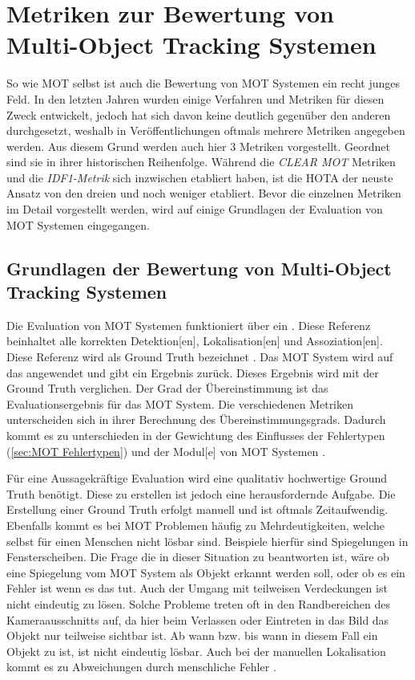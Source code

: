 \section{Metriken zur Bewertung von Multi-Object Tracking Systemen}
So wie \gls{MOT} selbst ist auch die Bewertung von \gls{MOT} Systemen ein recht junges Feld. In den letzten Jahren wurden einige Verfahren und Metriken für diesen Zweck entwickelt, jedoch hat sich davon keine deutlich gegenüber den anderen durchgesetzt, weshalb in Veröffentlichungen oftmals mehrere Metriken angegeben werden. Aus diesem Grund werden auch hier 3 Metriken vorgestellt. Geordnet sind sie in ihrer historischen Reihenfolge. Während die  \textit{\acrshort{CLEAR} \gls{MOT}} Metriken \cite{CLEAR.2008} und die \textit{\gls{IDF1}-Metrik} \cite{IDF1} sich inzwischen etabliert haben, ist die \gls{HOTA} \cite{HOTA} der neuste Ansatz von den dreien und noch weniger etabliert. Bevor die einzelnen Metriken im Detail vorgestellt werden, wird auf einige Grundlagen der Evaluation von \gls{MOT} Systemen eingegangen.

\subsection{Grundlagen der Bewertung von Multi-Object Tracking Systemen} \label{sec:MOT GT}
Die Evaluation von \gls{MOT} Systemen funktioniert über ein . Diese Referenz beinhaltet alle korrekten \gls{Detektion}[en], \gls{Lokalisation}[en] und \gls{Assoziation}[en]. Diese Referenz wird als \gls{Ground Truth} bezeichnet \cite{HOTA}. Das \gls{MOT} System wird auf das  angewendet und gibt ein Ergebnis zurück. Dieses Ergebnis wird mit der \gls{Ground Truth} verglichen. Der Grad der Übereinstimmung ist das Evaluationsergebnis für das \gls{MOT} System. Die verschiedenen Metriken unterscheiden sich in ihrer Berechnung des Übereinstimmungsgrads. Dadurch kommt es zu unterschieden in der Gewichtung des Einflusses der Fehlertypen (\ref{sec:MOT Fehlertypen}) und der \gls{Modul}[e] von \gls{MOT} Systemen \cite{HOTA, IDF1, CLEAR.2008}.\par

Für eine Aussagekräftige Evaluation wird eine qualitativ hochwertige \gls{Ground Truth} benötigt. Diese zu erstellen ist jedoch eine herausfordernde Aufgabe. Die Erstellung einer \gls{Ground Truth} erfolgt manuell und ist oftmals Zeitaufwendig. Ebenfalls kommt es bei \gls{MOT} Problemen häufig zu Mehrdeutigkeiten, welche selbst für einen Menschen nicht lösbar sind. Beispiele hierfür sind Spiegelungen in Fensterscheiben. Die Frage die in dieser Situation zu beantworten ist, wäre ob eine Spiegelung vom \gls{MOT} System als Objekt erkannt werden soll, oder ob es ein Fehler ist wenn es das tut. Auch der Umgang mit teilweisen Verdeckungen ist nicht eindeutig zu lösen. Solche Probleme treten oft in den Randbereichen des Kameraausschnitts auf, da hier beim Verlassen oder Eintreten in das Bild das Objekt nur teilweise sichtbar ist. Ab wann bzw. bis wann in diesem Fall ein Objekt zu  ist, ist nicht eindeutig lösbar. Auch bei der manuellen \gls{Lokalisation} kommt es zu Abweichungen durch menschliche Fehler \cite{MOT15, Milan.2013}.  \par

